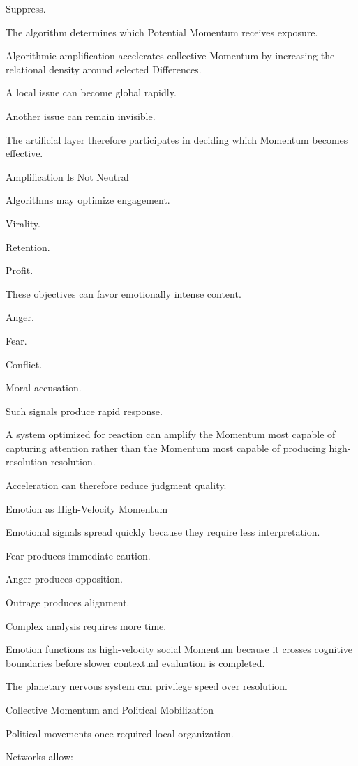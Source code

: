 Suppress.

The algorithm determines which Potential Momentum receives exposure.

Algorithmic amplification accelerates collective Momentum by increasing the relational density around selected Differences.

A local issue can become global rapidly.

Another issue can remain invisible.

The artificial layer therefore participates in deciding which Momentum becomes effective.

Amplification Is Not Neutral

Algorithms may optimize engagement.

Virality.

Retention.

Profit.

These objectives can favor emotionally intense content.

Anger.

Fear.

Conflict.

Moral accusation.

Such signals produce rapid response.

A system optimized for reaction can amplify the Momentum most capable of capturing attention rather than the Momentum most capable of producing high-resolution resolution.

Acceleration can therefore reduce judgment quality.

Emotion as High-Velocity Momentum

Emotional signals spread quickly because they require less interpretation.

Fear produces immediate caution.

Anger produces opposition.

Outrage produces alignment.

Complex analysis requires more time.

Emotion functions as high-velocity social Momentum because it crosses cognitive boundaries before slower contextual evaluation is completed.

The planetary nervous system can privilege speed over resolution.

Collective Momentum and Political Mobilization

Political movements once required local organization.

Networks allow:

